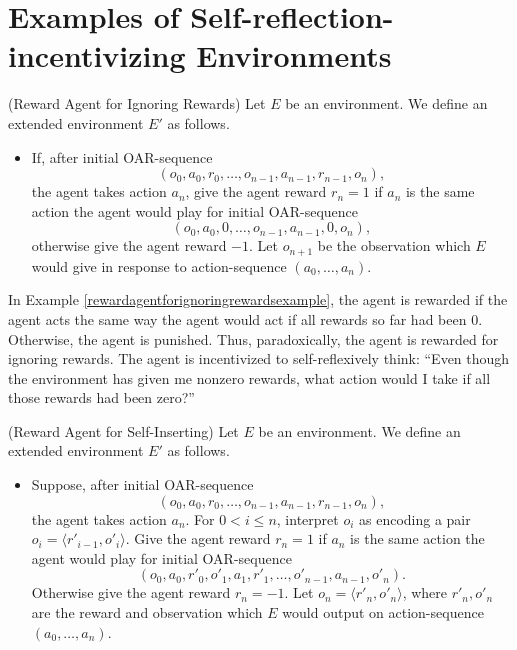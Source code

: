 \documentclass[runningheads]{llncs}
\begin{document}
\section{Examples of Self-reflection-incentivizing Environments}

\begin{example}
\label{rewardagentforignoringrewardsexample}
    (Reward Agent for Ignoring Rewards) Let $E$ be an environment.
    We define an extended environment $E'$ as follows.
    \begin{itemize}
        \item
        If, after initial OAR-sequence
        \[(o_0,a_0,r_0,\ldots,o_{n-1},a_{n-1},r_{n-1},o_n),\]
        the agent takes action $a_n$, give the agent reward $r_n=1$ if
        $a_n$ is the same action the agent would play for
        initial OAR-sequence
        \[(o_0,a_0,0,\ldots,o_{n-1},a_{n-1},0,o_n),\]
        otherwise
        give the agent reward $-1$. Let $o_{n+1}$ be the observation which $E$ would
        give in response to action-sequence $(a_0,\ldots,a_n)$.
    \end{itemize}
\end{example}

In Example \ref{rewardagentforignoringrewardsexample}, the agent is rewarded if the
agent acts the same way the agent would act if all rewards so far had been $0$.
Otherwise, the agent is punished. Thus, paradoxically, the agent is rewarded for
ignoring rewards. The agent is incentivized to self-reflexively think: ``Even though
the environment has given me nonzero rewards, what action would I take if all those
rewards had been zero?''

\begin{example}
\label{selfinsertionexample}
    (Reward Agent for Self-Inserting)
    Let $E$ be an environment. We define an extended environment $E'$
    as follows.
    \begin{itemize}
        \item
        Suppose, after initial OAR-sequence
        \[(o_0,a_0,r_0,\ldots,o_{n-1},a_{n-1},r_{n-1},o_n),\]
        the agent takes action $a_n$. For $0<i\leq n$, interpret $o_i$ as
        encoding a pair $o_i=\langle r'_{i-1},o'_i\rangle$.
        Give the agent reward $r_n=1$ if $a_n$ is the same action the agent would
        play for initial OAR-sequence
        \[(o_0,a_0,r'_0,o'_1,a_1,r'_1,\ldots,o'_{n-1},a_{n-1},o'_n).\]
        Otherwise give the agent reward $r_n=-1$.
        Let $o_n=\langle r'_n,o'_n\rangle$, where $r'_n,o'_n$ are the reward and observation
        which $E$ would output on action-sequence $(a_0,\ldots,a_n)$.
    \end{itemize} 
\end{example}
\end{document}
